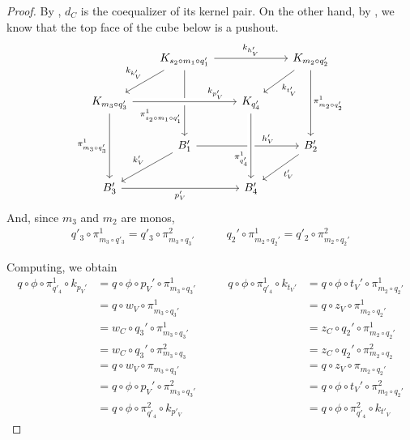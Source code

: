 \begin{proof}
	By , $d_C$ is the coequalizer of its kernel pair. On the other hand, by , we know that the top face of the cube below is a pushout.
	\[\begin{tikzcd}[row sep=20, column sep = 20]
	& {K_{s_2\circ m_1 \circ q_1'}} && {K_{m_2\circ q_2'}} \\
	{K_{m_3 \circ q_3'}} && {K_{q_4'}} \\
	& {B'_1} && {B'_2} \\
	{B'_3} && {B'_4}
	\arrow["{k_{h'_V}}", from=1-2, to=1-4]
	\arrow["{k_{k_V'}}"', from=1-2, to=2-1]
	\arrow["{\pi_{s_2\circ m_1 \circ q_1'}^1}"'{pos=0.7}, from=1-2, to=3-2]
	\arrow["{k_{t_V'}}", from=1-4, to=2-3]
	\arrow["{\pi_{m_2\circ q_2'}^1}", from=1-4, to=3-4]
	\arrow["{k_{p_V'}}"{pos=0.8}, from=2-1, to=2-3, crossing over]
	\arrow["{\pi_{m_3 \circ q_3'}^1}"', from=2-1, to=4-1]
	\arrow["{h_V'}"{pos=0.7}, from=3-2, to=3-4]
	\arrow["{\pi_{q_4'}^1}"'{pos=0.7}, from=2-3, to=4-3, crossing over]
	\arrow["{k_V'}"', from=3-2, to=4-1]
	\arrow["{t_V'}", from=3-4, to=4-3]
	\arrow["{p_V'}"', from=4-1, to=4-3]
	\end{tikzcd}\]
	And, since $m_3$ and $m_2$ are monos,
	\[\begin{split}
		q'_3 \circ \pi_{m_3 \circ q'_3}^1 = q'_3 \circ \pi_{m_3\circ q_3'}^2
	\end{split}\qquad\begin{split}
		q_2' \circ \pi_{m_2 \circ q_2'}^1 = q'_2 \circ \pi_{m_2 \circ q_2'}^2
	\end{split}\]
	
	Computing, we obtain
	\[\begin{split}
		q \circ \phi \circ \pi_{q'_4}^1 \circ k_{p_V'} &= q \circ \phi \circ p_V' \circ \pi_{m_3 \circ q_3'}^1 \\ &= q \circ w_V \circ \pi_{m_3 \circ q_3'}^1 \\ &= w_C \circ q_3' \circ \pi_{m_3 \circ q_3'}^1 \\ &= w_C \circ q_3' \circ \pi_{m_3 \circ q_3}^2 \\ &= q \circ w_V \circ \pi_{m_3 \circ q_3'} \\ &= q \circ \phi \circ p_V' \circ \pi_{m_3 \circ q_3'}^2 \\ &= q \circ \phi \circ \pi_{q'_4}^2 \circ k_{p'_V}
	\end{split}\qquad\begin{split}
		q \circ \phi \circ \pi_{q'_4}^1 \circ k_{t_V'} &= q \circ \phi \circ t_V' \circ \pi_{m_2 \circ q_2'}^1 \\ &= q \circ z_V \circ \pi_{m_2 \circ q_2'}^1 \\ &= z_C \circ q_2' \circ \pi_{m_2 \circ q_2'}^1 \\ &= z_C \circ q_2' \circ \pi_{m_2 \circ q_2}^2 \\ &= q \circ z_V \circ \pi_{m_2 \circ q_2'} \\ &= q \circ \phi \circ t_V' \circ \pi_{m_2 \circ q_2'}^2 \\ &= q \circ \phi \circ \pi_{q'_4}^2 \circ k_{t'_V}
	\end{split}\]


\end{proof}
